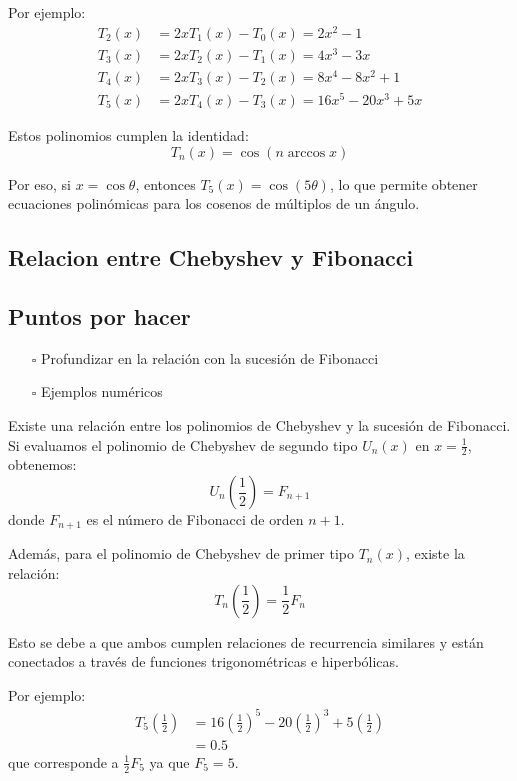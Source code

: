 Por ejemplo:
\begin{align*}
T_2(x) &= 2x T_1(x) - T_0(x) = 2x^2 - 1 \\
T_3(x) &= 2x T_2(x) - T_1(x) = 4x^3 - 3x \\
T_4(x) &= 2x T_3(x) - T_2(x) = 8x^4 - 8x^2 + 1 \\
T_5(x) &= 2x T_4(x) - T_3(x) = 16x^5 - 20x^3 + 5x
\end{align*}

Estos polinomios cumplen la identidad:
\begin{equation*}
T_n(x) = \cos(n \arccos x)
\end{equation*}

Por eso, si $x = \cos \theta$, entonces $T_5(x) = \cos(5\theta)$, lo que permite obtener ecuaciones polinómicas para los cosenos de múltiplos de un ángulo.

\subsection{Relacion entre Chebyshev y Fibonacci}

\subsection{Puntos por hacer}
\begin{itemize}
  \item[$\square$] Profundizar en la relación con la sucesión de Fibonacci
  \item[$\square$] Ejemplos numéricos
\end{itemize}

Existe una relación entre los polinomios de Chebyshev y la sucesión de Fibonacci. Si evaluamos el polinomio de Chebyshev de segundo tipo $U_n(x)$ en $x = \frac{1}{2}$, obtenemos:
\begin{equation*}
U_n\left(\frac{1}{2}\right) = F_{n+1}
\end{equation*}
donde $F_{n+1}$ es el número de Fibonacci de orden $n+1$.

Además, para el polinomio de Chebyshev de primer tipo $T_n(x)$, existe la relación:
\begin{equation*}
T_n\left(\frac{1}{2}\right) = \frac{1}{2} F_n
\end{equation*}

Esto se debe a que ambos cumplen relaciones de recurrencia similares y están conectados a través de funciones trigonométricas e hiperbólicas.

Por ejemplo:
\begin{align*}
T_5\left(\frac{1}{2}\right) &= 16\left(\frac{1}{2}\right)^5 - 20\left(\frac{1}{2}\right)^3 + 5\left(\frac{1}{2}\right) \\
&= 0.5
\end{align*}
que corresponde a $\frac{1}{2} F_5$ ya que $F_5 = 5$.

